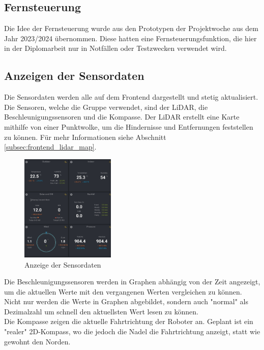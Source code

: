 \subsection{Fernsteuerung}
\label{subsec:frontend_control}
Die Idee der Fernsteuerung wurde aus den Prototypen der Projektwoche aus dem Jahr 2023/2024 übernommen. Diese hatten eine Fernsteuerungsfunktion, die hier in der Diplomarbeit nur in Notfällen oder Testzwecken verwendet wird.  

\subsection{Anzeigen der Sensordaten}
\label{subsec:frontend_sensors}
Die Sensordaten werden alle auf dem Frontend dargestellt und stetig aktualisiert. Die Sensoren, welche die Gruppe verwendet, sind der LiDAR, die Beschleunigungssensoren und die Kompasse.
Der LiDAR erstellt eine Karte mithilfe von einer Punktwolke, um die Hindernisse und Entfernungen feststellen zu können. Für mehr Informationen siehe Abschnitt \ref{subsec:frontend_lidar_map}.
\begin{figure}[H]
    \includegraphics[width=0.4\textwidth, center]{img/Sensor_Anzeige_LOESCHEN.png}
    \caption{Anzeige der Sensordaten}
    \label{fig:Sensordaten}
\end{figure}
Die Beschleunigungssensoren werden in Graphen abhängig von der Zeit angezeigt, um die aktuellen Werte mit den vergangenen Werten vergleichen zu können. Nicht nur werden die Werte in Graphen abgebildet, sondern auch "normal" als Dezimalzahl
um schnell den aktuellsten Wert lesen zu können.
\\
Die Kompasse zeigen die aktuelle Fahrtrichtung der Roboter an. Geplant ist ein "realer" 2D-Kompass, wo die jedoch die Nadel die Fahrtrichtung anzeigt, statt wie gewohnt den Norden.